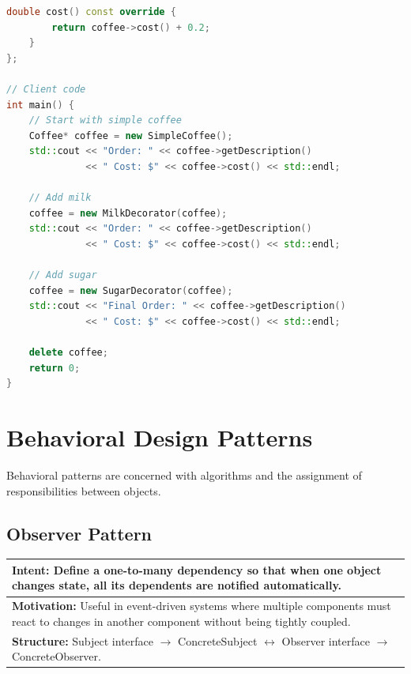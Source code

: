 \documentclass[12pt,a4paper]{article}
\begin{document}
\begin{lstlisting}[language=C++, caption={Decorator Pattern Implementation in C++}, label=lst:decorator]
    double cost() const override {
        return coffee->cost() + 0.2;
    }
};

// Client code
int main() {
    // Start with simple coffee
    Coffee* coffee = new SimpleCoffee();
    std::cout << "Order: " << coffee->getDescription() 
              << " Cost: $" << coffee->cost() << std::endl;
    
    // Add milk
    coffee = new MilkDecorator(coffee);
    std::cout << "Order: " << coffee->getDescription() 
              << " Cost: $" << coffee->cost() << std::endl;
    
    // Add sugar
    coffee = new SugarDecorator(coffee);
    std::cout << "Final Order: " << coffee->getDescription() 
              << " Cost: $" << coffee->cost() << std::endl;
    
    delete coffee;
    return 0;
}
\end{lstlisting}

\section{Behavioral Design Patterns}
\label{sec:behavioral-patterns}

Behavioral patterns are concerned with algorithms and the assignment of responsibilities between objects.

\subsection{Observer Pattern}
\label{subsec:observer}

\begin{tabular}{p{}}
    \hline
    \rowcolor{lightgray}
    \textbf{Intent:} Define a one-to-many dependency so that when one object changes state, all its dependents are notified automatically. \\
    \hline
    \textbf{Motivation:} Useful in event-driven systems where multiple components must react to changes in another component without being tightly coupled. \\
    \hline
    \textbf{Structure:} Subject interface $\rightarrow$ ConcreteSubject $\leftrightarrow$ Observer interface $\rightarrow$ ConcreteObserver. \\
    \hline
\end{tabular}

\vspace{1em}
\end{document}
